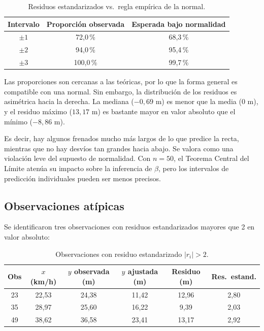 \documentclass[12pt,a4paper]{article}
\begin{document}
\begin{table}[H]
\centering
\caption{Residuos estandarizados vs.\ regla empírica de la normal.}
\begin{tabular}{ccc}
\toprule
\textbf{Intervalo} & \textbf{Proporción observada} & \textbf{Esperada bajo normalidad} \\
\midrule
$\pm 1$ & 72{,}0\,\% & 68{,}3\,\% \\
$\pm 2$ & 94{,}0\,\% & 95{,}4\,\% \\
$\pm 3$ & 100{,}0\,\% & 99{,}7\,\% \\
\bottomrule
\end{tabular}
\end{table}

Las proporciones son cercanas a las teóricas, por lo que la forma general es compatible con una normal. Sin embargo, la distribución de los residuos es asimétrica hacia la derecha. La mediana ($-0{,}69$ m) es menor que la media ($0$ m), y el residuo máximo ($13{,}17$ m) es bastante mayor en valor absoluto que el mínimo ($-8{,}86$ m).

Es decir, hay algunos frenados mucho más largos de lo que predice la recta, mientras que no hay desvíos tan grandes hacia abajo. Se valora como una violación leve del supuesto de normalidad. Con $n = 50$, el Teorema Central del Límite atenúa su impacto sobre la inferencia de $\beta$, pero los intervalos de predicción individuales pueden ser menos precisos.

\subsection{Observaciones atípicas}

Se identificaron tres observaciones con residuos estandarizados mayores que 2 en valor absoluto:

\begin{table}[H]
\centering
\caption{Observaciones con residuo estandarizado $|r_i| > 2$.}
\small
\begin{tabular}{cccccc}
\toprule
\textbf{Obs} & \textbf{$x$ (km/h)} & \textbf{$y$ observada (m)} & \textbf{$\hat{y}$ ajustada (m)} & \textbf{Residuo (m)} & \textbf{Res.\ estand.} \\
\midrule
23 & 22{,}53 & 24{,}38 & 11{,}42 & 12{,}96 & 2{,}80 \\
35 & 28{,}97 & 25{,}60 & 16{,}22 & 9{,}39 & 2{,}03 \\
49 & 38{,}62 & 36{,}58 & 23{,}41 & 13{,}17 & 2{,}92 \\
\bottomrule
\end{tabular}
\end{table}
\end{document}
